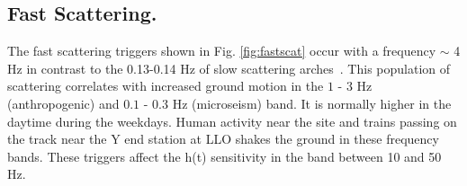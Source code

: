\documentclass[12pt]{iopart}
\begin{document}




\subsection{Fast Scattering.}
The fast scattering triggers shown in Fig. \ref{fig:fastscat} occur with a frequency $\sim$ 4 Hz in contrast to the 0.13-0.14 Hz of slow scattering arches~\cite{alogjosh}. This population of scattering correlates with increased ground motion in the  $1$ - $3$ Hz (anthropogenic) and $0.1$ - $0.3$ Hz (microseism) band. It is normally higher in the daytime during the weekdays. Human activity near the site and trains passing on the track near the Y end station at LLO shakes the ground in these frequency bands. 
These triggers affect the h(t) sensitivity in the band between 10 and 50 Hz.
\end{document}
